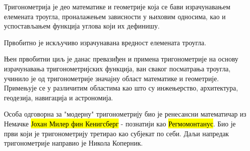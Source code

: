 \documentclass[../diplomski.tex]{subfiles}
\begin{document}
Тригонометрија је део математике и геометрије која се бави израчунавањем
елемената троугла, проналажењем зависности у њиховим односима, као и
успостављањем функција углова који их дефинишу.

Првобитно је искључиво израчунавана вредност елемената троугла.

Њен првобитни циљ је данас превазиђен и примена тригонометрије на основу
израчунавања тригонометријских функција, ван сваког посматрања троугла,
учинило је од тригонометрије значајну област математике и геометрије.
Примењује се у различитим областима као што су инжењерство, архитектура,
геодезија, навигација и астрономија.

Особа одговорна за "модерну" тригонометрију био је ренесансни
математичар из Немачке \hl{Јохан Милер фин Кенигсберг} - познатији као
\hl{Регмомонтанус}. Био је први који је тригонометрију третирао као субјекат
по себи. Даљи напредак тригонометрије направио је Никола Коперник.
\end{document}
